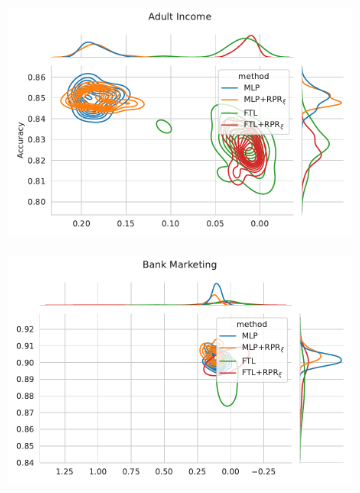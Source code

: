 \begin{figure}
\centering
\caption{Metric distribution optimizing Acc. and Statistical Parity in comparison with Redlining Penalty Regularization across multiple resample runs. Corresponding values available at Table~\ref{tab:complete_acc_parity_rpr}.}
\label{fig:complete_acc_parity_rpr}
\begin{subfigure}{.45\linewidth}
    \includegraphics[width=1\linewidth]{images/pareto_acc_parity_adult_rpr.pdf}
\end{subfigure}
\begin{subfigure}{.45\linewidth}
    \includegraphics[width=1\linewidth]{images/pareto_acc_parity_bank_rpr.pdf}
\end{subfigure}


\end{figure}
